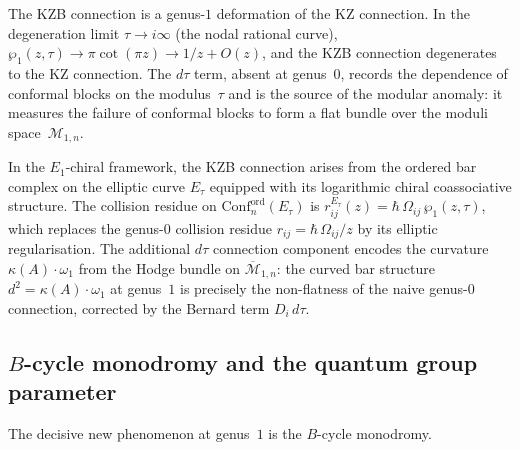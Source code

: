 \begin{remark}
The KZB connection is a genus-$1$ deformation of the KZ connection. In
the degeneration limit $\tau \to i\infty$ (the nodal rational curve),
$\wp_1(z,\tau) \to \pi\cot(\pi z) \to 1/z + O(z)$, and the KZB
connection degenerates to the KZ connection. The $d\tau$ term,
absent at genus~$0$, records the dependence of conformal blocks on the
modulus~$\tau$ and is the source of the modular anomaly: it measures the
failure of conformal blocks to form a flat bundle over the moduli
space~$\mathcal{M}_{1,n}$.
\end{remark}

\begin{remark}
\label{rem:kzb-bar}
In the $E_1$-chiral framework, the KZB connection arises from the
ordered bar complex on the elliptic curve $E_\tau$ equipped with its
logarithmic chiral coassociative structure. The collision residue on
$\mathrm{Conf}_n^{\mathrm{ord}}(E_\tau)$ is
$r_{ij}^{E_\tau}(z) = \hbar\,\Omega_{ij}\,\wp_1(z,\tau)$,
which replaces the genus-$0$ collision residue $r_{ij} = \hbar\,\Omega_{ij}/z$
by its elliptic regularisation. The additional $d\tau$ connection
component encodes the curvature $\kappa(A) \cdot \omega_1$ from the
Hodge bundle on $\overline{\mathcal{M}}_{1,n}$: the curved bar
structure $d^2 = \kappa(A) \cdot \omega_1$ at genus~$1$ is precisely
the non-flatness of the naive genus-$0$ connection, corrected by the
Bernard term $D_i\,d\tau$.
\end{remark}

\subsection{$B$-cycle monodromy and the quantum group parameter}
\label{sec:b-cycle-monodromy}

The decisive new phenomenon at genus~$1$ is the $B$-cycle monodromy.


